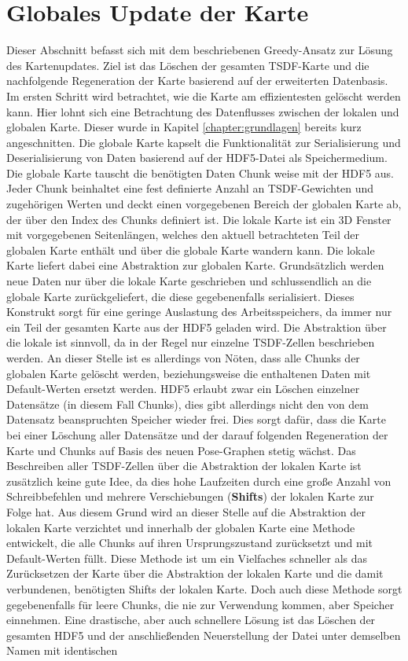 \section{Globales Update der Karte}
\label{section:global_update}

Dieser Abschnitt befasst sich mit dem beschriebenen Greedy-Ansatz zur Lösung des Kartenupdates. Ziel ist das Löschen der gesamten TSDF-Karte und die nachfolgende Regeneration der Karte basierend auf der erweiterten Datenbasis. Im ersten Schritt wird betrachtet, wie die Karte am effizientesten gelöscht werden kann. Hier lohnt sich eine Betrachtung des Datenflusses zwischen der lokalen und globalen Karte. Dieser wurde in Kapitel \ref{chapter:grundlagen} bereits kurz angeschnitten. Die globale Karte kapselt die Funktionalität zur Serialisierung und Deserialisierung von Daten basierend auf der HDF5-Datei als Speichermedium. Die globale Karte tauscht die benötigten Daten Chunk weise mit der HDF5 aus. Jeder Chunk beinhaltet eine fest definierte Anzahl an TSDF-Gewichten und zugehörigen Werten und deckt einen vorgegebenen Bereich der globalen Karte ab, der über den Index des Chunks definiert ist. Die lokale Karte ist ein 3D Fenster mit vorgegebenen Seitenlängen, welches den aktuell betrachteten Teil der globalen Karte enthält und über die globale Karte wandern kann. Die lokale Karte liefert dabei eine Abstraktion zur globalen Karte. Grundsätzlich werden neue Daten nur über die lokale Karte geschrieben und schlussendlich an die globale Karte zurückgeliefert, die diese gegebenenfalls serialisiert. Dieses Konstrukt sorgt für eine geringe Auslastung des Arbeitsspeichers, da immer nur ein Teil der gesamten Karte aus der HDF5 geladen wird. Die Abstraktion über die lokale ist sinnvoll, da in der Regel nur einzelne TSDF-Zellen beschrieben werden. An dieser Stelle ist es allerdings von Nöten, dass alle Chunks der globalen Karte gelöscht werden, beziehungsweise die enthaltenen Daten mit Default-Werten ersetzt werden. HDF5 erlaubt zwar ein Löschen einzelner Datensätze (in diesem Fall Chunks), dies gibt allerdings nicht den von dem Datensatz beanspruchten Speicher wieder frei. Dies sorgt dafür, dass die Karte bei einer Löschung aller Datensätze und der darauf folgenden Regeneration der Karte und Chunks auf Basis des neuen Pose-Graphen stetig wächst. Das Beschreiben aller TSDF-Zellen über die Abstraktion der lokalen Karte ist zusätzlich keine gute Idee, da dies hohe Laufzeiten durch eine große Anzahl von Schreibbefehlen und mehrere Verschiebungen (\textbf{Shifts}) der lokalen Karte zur Folge hat. Aus diesem Grund wird an dieser Stelle auf die Abstraktion der lokalen Karte verzichtet und innerhalb der globalen Karte eine Methode entwickelt, die alle Chunks auf ihren Ursprungszustand zurücksetzt und mit Default-Werten füllt. Diese Methode ist um ein Vielfaches schneller als das Zurücksetzen der Karte über die Abstraktion der lokalen Karte und die damit verbundenen, benötigten Shifts der lokalen Karte. Doch auch diese Methode sorgt gegebenenfalls für leere Chunks, die nie zur Verwendung kommen, aber Speicher einnehmen. Eine drastische, aber auch schnellere Lösung ist das Löschen der gesamten HDF5 und der anschließenden Neuerstellung der Datei unter demselben Namen mit identischen 